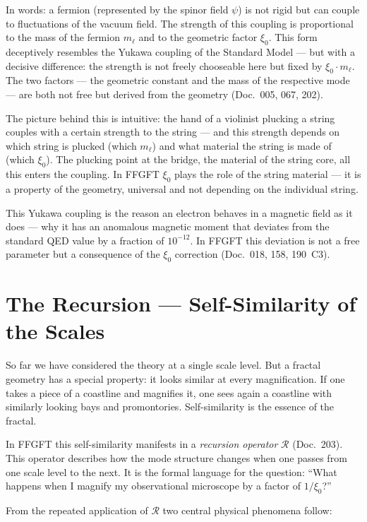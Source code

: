 \medskip\noindent
In words: a fermion (represented by the spinor field $\psi$) is not
rigid but can couple to fluctuations of the vacuum field. The
strength of this coupling is proportional to the mass of the
fermion $m_\ell$ and to the geometric factor $\xi_0$. This form
deceptively resembles the Yukawa coupling of the Standard Model ---
but with a decisive difference: the strength is not freely
chooseable here but fixed by $\xi_0 \cdot m_\ell$. The two factors
--- the geometric constant and the mass of the respective mode ---
are both not free but derived from the geometry (Doc.~005, 067,
202).

The picture behind this is intuitive: the hand of a violinist
plucking a string couples with a certain strength to the string ---
and this strength depends on which string is plucked (which
$m_\ell$) and what material the string is made of (which $\xi_0$).
The plucking point at the bridge, the material of the string core,
all this enters the coupling. In FFGFT $\xi_0$ plays the role of
the string material --- it is a property of the geometry, universal
and not depending on the individual string.

This Yukawa coupling is the reason an electron behaves in a magnetic
field as it does --- why it has an anomalous magnetic moment that
deviates from the standard QED value by a fraction of $10^{-12}$. In
FFGFT this deviation is not a free parameter but a consequence of
the $\xi_0$ correction (Doc.~018, 158, 190~C3).

\section{The Recursion --- Self-Similarity of the Scales}

So far we have considered the theory at a single scale level. But a
fractal geometry has a special property: it looks similar at every
magnification. If one takes a piece of a coastline and magnifies it,
one sees again a coastline with similarly looking bays and
promontories. Self-similarity is the essence of the fractal.

In FFGFT this self-similarity manifests in a \emph{recursion
operator} $\mathcal{R}$ (Doc.~203). This operator describes how the
mode structure changes when one passes from one scale level to the
next. It is the formal language for the question: \enquote{What
happens when I magnify my observational microscope by a factor of
$1/\xi_0$?}

From the repeated application of $\mathcal{R}$ two central physical
phenomena follow:

